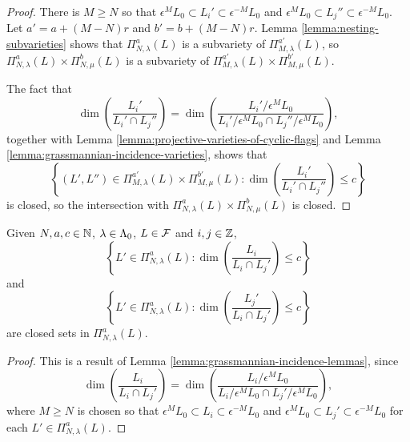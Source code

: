 \documentclass[a4paper, 11pt]{report}
\begin{document}
\begin{proof}
There is $M\geq N$ so that $\epsilon^M L_0\subset L_i'\subset\epsilon^{-M}L_0$ and $\epsilon^M L_0\subset L_j''\subset\epsilon^{-M}L_0$. Let $a'=a+(M-N)r$ and $b'=b+(M-N)r$. Lemma \ref{lemma:nesting-subvarieties} shows that $\Pi_{N,\lambda}^a(L)$ is a subvariety of $\Pi_{M,\lambda}^{a'}(L)$, so $\Pi_{N,\lambda}^a(L)\times\Pi_{N,\mu}^b(L)$ is a subvariety of $\Pi_{M,\lambda}^{a'}(L)\times\Pi_{M,\mu}^{b'}(L)$.

The fact that
\begin{equation*}
\dim\left(\frac{L_i'}{L_i'\cap L_j''}\right) = \dim\left(\frac{L_i'/{\epsilon^M L_0}}{L_i'/{\epsilon^M L_0}\cap L_j''/{\epsilon^M L_0}}\right),
\end{equation*}
together with Lemma \ref{lemma:projective-varieties-of-cyclic-flags} and Lemma \ref{lemma:grassmannian-incidence-varieties}, shows that
\begin{equation*}
\left\{(L',L'')\in\Pi_{M,\lambda}^{a'}(L)\times\Pi_{M,\mu}^{b'}(L):\dim\left(\frac{L_i'}{L_i'\cap L_j''}\right)\le c\right\}
\end{equation*}
is closed, so the intersection with $\Pi_{N,\lambda}^a(L)\times\Pi_{N,\mu}^b(L)$ is closed.
\end{proof}

\begin{lemma}\label{lemma:incidence-varieties-consequences}
Given $N,a,c\in\mathbb{N}$, $\lambda\in\Lambda_0{}$, $L\in\mathcal{F}$ and $i,j\in\mathbb{Z}$,
\begin{equation*}
\left\{L'\in\Pi_{N,\lambda}^a(L):\dim\left(\frac{L_i}{L_i\cap L_j'}\right)\le c\right\}
\end{equation*}
and
\begin{equation*}
\left\{L'\in\Pi_{N,\lambda}^a(L): \dim\left(\frac{L_j'}{L_i\cap L_j'}\right)\le c\right\}
\end{equation*}
are closed sets in $\Pi_{N,\lambda}^a(L)$.
\end{lemma}

\begin{proof}
This is a result of Lemma \ref{lemma:grassmannian-incidence-lemmas}, since
\begin{equation*}
\dim\left(\frac{L_i}{L_i\cap L_j'}\right) = \dim\left(\frac{L_i/{\epsilon^M L_0}}{L_i/{\epsilon^M L_0}\cap L_j'/{\epsilon^M L_0}}\right),
\end{equation*}
where $M\geq N$ is chosen so that $\epsilon^M L_0\subset L_i\subset\epsilon^{-M}L_0$ and $\epsilon^M L_0\subset L_j'\subset\epsilon^{-M}L_0$ for each $L'\in\Pi_{N,\lambda}^a(L)$.
\end{proof}
\end{document}
